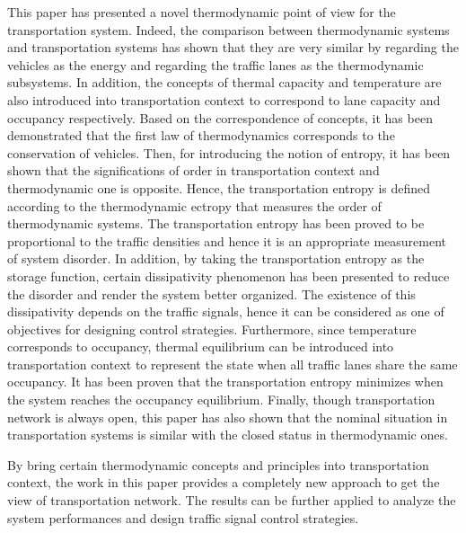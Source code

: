 \documentclass[preprint,authoryear,12pt]{elsarticle}
\begin{document}
This paper has presented a novel thermodynamic point of view for the transportation system. Indeed, the comparison between thermodynamic systems and transportation systems has shown that they are very similar by regarding the vehicles as the energy and regarding the traffic lanes as the thermodynamic subsystems. In addition, the concepts of thermal capacity and temperature are also introduced into transportation context to correspond to lane capacity and occupancy respectively. Based on the correspondence of concepts, it has been demonstrated that the first law of thermodynamics corresponds to the conservation of vehicles. Then, for introducing the notion of entropy, it has been shown that the significations of order in transportation context and thermodynamic one is opposite. Hence, the transportation entropy is defined according to the thermodynamic ectropy that measures the order of thermodynamic systems. The transportation entropy has been proved to be proportional to the traffic densities and hence it is an appropriate measurement of system disorder.
In addition, by taking the transportation entropy as the storage function, certain dissipativity phenomenon has been presented to reduce the disorder and render the system better organized. The existence of this dissipativity depends on the traffic signals, hence it can be considered as one of objectives for designing control strategies.
Furthermore, since temperature corresponds to occupancy, thermal equilibrium can be introduced into transportation context to represent the state when all traffic lanes share the same occupancy. It has been proven that the transportation entropy minimizes when the system reaches the occupancy equilibrium. Finally, though transportation network is always open, this paper has also shown that the nominal situation in transportation systems is similar with the closed status in thermodynamic ones.

By bring certain thermodynamic concepts and principles into transportation context, the work in this paper provides a completely new approach to get the view of transportation network. The results can be further applied to analyze the system performances and design traffic signal control strategies.



\end{document}
